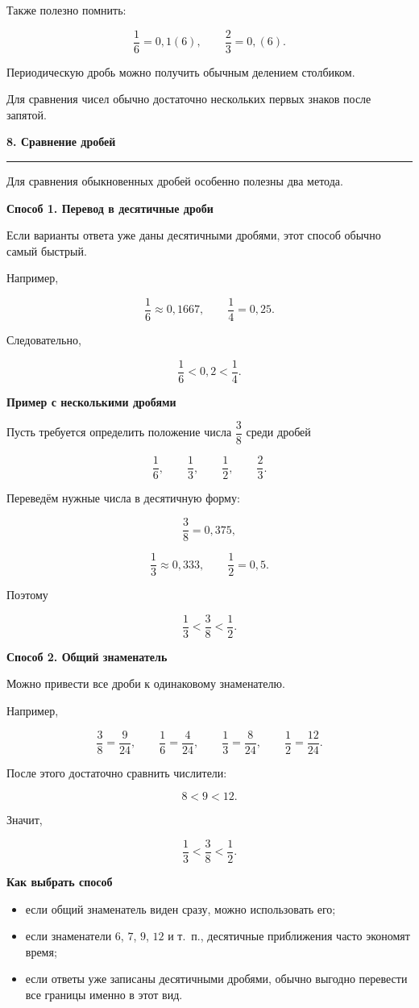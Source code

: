 \documentclass[a4paper,12pt]{article}
\newcommand{\topic}[1]{%
    \par\vspace{0.9em}%
    {\Large\bfseries\color{darkaccent}#1}\par
    \vspace{0.25em}
    \noindent
    \color{accent}\rule{\linewidth}{0.6pt}
    \color{black}
    \vspace{0.55em}
}
\newcommand{\subtopic}[1]{%
    \par\vspace{0.55em}%
    {\large\bfseries\color{textgray}#1}\par
    \vspace{0.2em}
}
\begin{document}
Также полезно помнить:

\[
\frac16=0{,}1(6),
\qquad
\frac23=0{,}(6).
\]

Периодическую дробь можно получить обычным делением столбиком.

Для сравнения чисел обычно достаточно нескольких первых
знаков после запятой.


\topic{8. Сравнение дробей}

Для сравнения обыкновенных дробей особенно полезны два метода.

\subtopic{Способ 1. Перевод в десятичные дроби}

Если варианты ответа уже даны десятичными дробями,
этот способ обычно самый быстрый.

Например,

\[
\frac16\approx0{,}1667,
\qquad
\frac14=0{,}25.
\]

Следовательно,

\[
\frac16<0{,}2<\frac14.
\]

\subtopic{Пример с несколькими дробями}

Пусть требуется определить положение числа $\dfrac38$ среди дробей

\[
\frac16,\qquad
\frac13,\qquad
\frac12,\qquad
\frac23.
\]

Переведём нужные числа в десятичную форму:

\[
\frac38=0{,}375,
\]

\[
\frac13\approx0{,}333,
\qquad
\frac12=0{,}5.
\]

Поэтому

\[
\frac13<\frac38<\frac12.
\]

\subtopic{Способ 2. Общий знаменатель}

Можно привести все дроби к одинаковому знаменателю.

Например,

\[
\frac38=\frac9{24},
\qquad
\frac16=\frac4{24},
\qquad
\frac13=\frac8{24},
\qquad
\frac12=\frac{12}{24}.
\]

После этого достаточно сравнить числители:

\[
8<9<12.
\]

Значит,

\[
\frac13<\frac38<\frac12.
\]

\subtopic{Как выбрать способ}

\begin{itemize}
    \item если общий знаменатель виден сразу,
    можно использовать его;
    \item если знаменатели $6$, $7$, $9$, $12$ и т.~п.,
    десятичные приближения часто экономят время;
    \item если ответы уже записаны десятичными дробями,
    обычно выгодно перевести все границы именно в этот вид.
\end{itemize}
\end{document}
